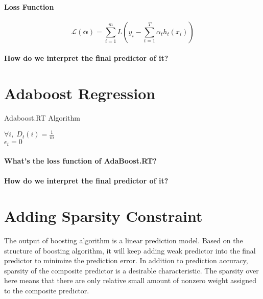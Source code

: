 \documentclass{article} %
\begin{document}
\paragraph{Loss Function}
\[ \mathcal{L}(\boldsymbol\alpha) = \sum_{i=1}^m L(y_i - \sum_{t=1}^T \alpha_t h_t(x_i))\]
\paragraph{How do we interpret the final predictor of it?}

\section{Adaboost Regression}
\begin{algorithm}[H]
\caption{Adaboost.RT Algorithm}
 \SetAlgoLined


  \BlankLine

  $\forall i,\;D_t(i)=\frac{1}{m}$\\
  $\epsilon_t=0$\\
\end{algorithm}
\paragraph{What's the loss function of AdaBoost.RT?}
\paragraph{How do we interpret the final predictor of it?}
\section{Adding Sparsity Constraint}
The output of boosting algorithm is a linear prediction model. Based on the structure of boosting algorithm, it will keep adding weak predictor into the final predictor to minimize the prediction error. In addition to prediction accuracy, sparsity of the composite predictor is a desirable characteristic. The sparsity over here means that there are only relative small amount of nonzero weight assigned to the composite predictor. 
\end{document}
